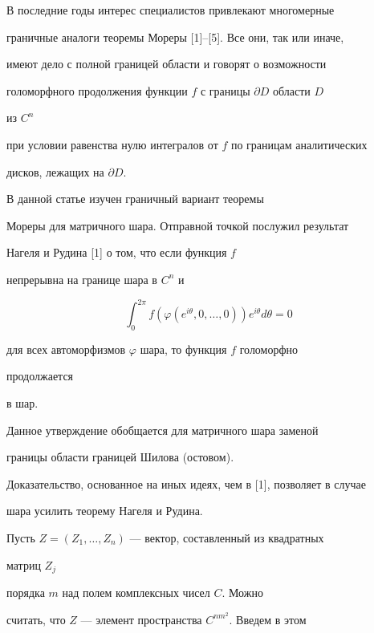 \label{begin} 


 


 


В последние годы интерес специалистов привлекают многомерные 


граничные аналоги теоремы Мореры [1]--[5]. Все они, так или иначе, 


имеют дело с полной границей области и говорят о возможности 


голоморфного продолжения функции $f$ с границы $\partial D$ области $D$ 


из $C^n$ 


при условии равенства нулю интегралов от $f$ по границам аналитических 


дисков, лежащих на $\partial D$. 


 


В данной статье изучен граничный вариант теоремы 


Мореры для матричного шара. Отправной точкой послужил результат 


Нагеля и Рудина [1] о том, что если функция $f$ 


непрерывна на границе шара в $C^n$ и


$$ 


\int^{2\pi}_0 f(\varphi(e^{i\theta},0,\dotsc,0)) 


e^{i\theta}d\theta=0 


$$ 


для всех автоморфизмов $\varphi$ шара, то функция $f$ голоморфно 


продолжается 


в шар. 


 


Данное утверждение обобщается для матричного шара заменой 


границы области границей Шилова (остовом). 


Доказательство, основанное на иных идеях, чем в [1], позволяет в случае 


шара усилить теорему Нагеля и Рудина. 


 


Пусть $Z=(Z_1,\dotsc,Z_n)$ --- вектор, составленный из квадратных 


матриц $Z_j$ 


порядка $m$ над полем комплексных чисел $C$. Можно 


считать, что $Z$ --- элемент пространства $C^{nm^2}$. Введем в этом 


